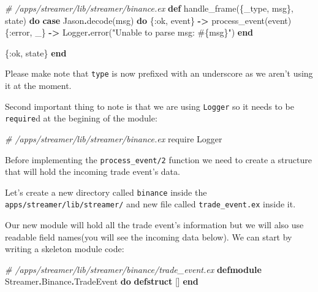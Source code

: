 \documentclass[
]{book}
\newenvironment{Shaded}{\begin{snugshade}}{\end{snugshade}}
\newcommand{\CommentTok}[1]{\textcolor[rgb]{0.56,0.35,0.01}{\textit{#1}}}
\newcommand{\ConstantTok}[1]{\textcolor[rgb]{0.00,0.00,0.00}{#1}}
\newcommand{\ImportTok}[1]{#1}
\newcommand{\KeywordTok}[1]{\textcolor[rgb]{0.13,0.29,0.53}{\textbf{#1}}}
\newcommand{\NormalTok}[1]{#1}
\newcommand{\OperatorTok}[1]{\textcolor[rgb]{0.81,0.36,0.00}{\textbf{#1}}}
\newcommand{\OtherTok}[1]{\textcolor[rgb]{0.56,0.35,0.01}{#1}}
\newcommand{\StringTok}[1]{\textcolor[rgb]{0.31,0.60,0.02}{#1}}
\newcommand{\VariableTok}[1]{\textcolor[rgb]{0.00,0.00,0.00}{#1}}
\begin{document}
\begin{Shaded}
\begin{Highlighting}[]
  \CommentTok{\# /apps/streamer/lib/streamer/binance.ex}
  \KeywordTok{def}\NormalTok{ handle\_frame(\{\_type, msg\}, state) }\KeywordTok{do}
    \KeywordTok{case} \ConstantTok{Jason}\OperatorTok{.}\NormalTok{decode(msg) }\KeywordTok{do}
\NormalTok{      \{}\VariableTok{:ok}\NormalTok{, event\} }\OperatorTok{{-}\textgreater{}}\NormalTok{ process\_event(event)}
\NormalTok{      \{}\VariableTok{:error}\NormalTok{, \_\} }\OperatorTok{{-}\textgreater{}} \ConstantTok{Logger}\OperatorTok{.}\NormalTok{error(}\StringTok{"Unable to parse msg: }\OtherTok{\#\{}\NormalTok{msg}\OtherTok{\}}\StringTok{"}\NormalTok{)}
    \KeywordTok{end}

\NormalTok{    \{}\VariableTok{:ok}\NormalTok{, state\}}
  \KeywordTok{end}
\end{Highlighting}
\end{Shaded}

Please make note that \texttt{type} is now prefixed with an underscore as we aren't using it at the moment.

Second important thing to note is that we are using \texttt{Logger} so it needs to be \texttt{require}d at the begining of the module:

\begin{Shaded}
\begin{Highlighting}[]
  \CommentTok{\# /apps/streamer/lib/streamer/binance.ex}
  \ImportTok{require} \ConstantTok{Logger}
\end{Highlighting}
\end{Shaded}

Before implementing the \texttt{process\_event/2} function we need to create a structure that will hold the incoming trade event's data.

Let's create a new directory called \texttt{binance} inside the \texttt{apps/streamer/lib/streamer/} and new file called \texttt{trade\_event.ex} inside it.

Our new module will hold all the trade event's information but we will also use readable field names(you will see the incoming data below). We can start by writing a skeleton module code:

\begin{Shaded}
\begin{Highlighting}[]
\CommentTok{\# /apps/streamer/lib/streamer/binance/trade\_event.ex}
\KeywordTok{defmodule} \ConstantTok{Streamer}\OperatorTok{.}\ConstantTok{Binance}\OperatorTok{.}\ConstantTok{TradeEvent} \KeywordTok{do}
    \KeywordTok{defstruct}\NormalTok{ []}
\KeywordTok{end}
\end{Highlighting}
\end{Shaded}
\end{document}
